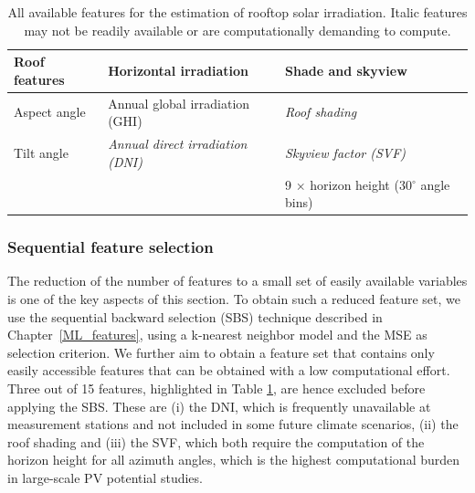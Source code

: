 \begin{table}[tb]
\centering
\footnotesize
\caption{All available features for the estimation of rooftop solar irradiation. Italic features may not be readily available or are computationally demanding to compute.}
\label{tab:chile_features}
\begin{tabular}{lll}
\hline
\textbf{Roof features} & \textbf{Horizontal irradiation}          & \textbf{Shade and skyview}         \\ \hline
Aspect angle           & Annual global irradiation (GHI)          & \textit{Roof shading}              \\
Tilt angle             & \textit{Annual direct irradiation (DNI)} & \textit{Skyview factor (SVF)}      \\
                       &                                          & 9 $\times$ horizon height (30$^\circ$ angle bins) \\ \hline
\end{tabular}
\end{table}


\subsubsection{Sequential feature selection}
The reduction of the number of features to a small set of easily available variables is one of the key aspects of this section. To obtain such a reduced feature set, we use the sequential backward selection (SBS) technique described in Chapter~\ref{ML_features}, using a k-nearest neighbor model and the MSE as selection criterion.
We further aim to obtain a feature set that contains only easily accessible features that can be obtained with a low computational effort. Three out of 15 features, highlighted in Table \ref{tab:chile_features}, are hence excluded before applying the SBS. These are (i) the DNI, which is frequently unavailable at measurement stations and not included in some future climate scenarios, (ii) the roof shading and (iii) the SVF, which both require the computation of the horizon height for all azimuth angles, which is the highest computational burden in large-scale PV potential studies. 

